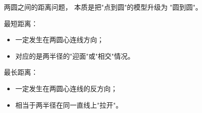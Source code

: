 \begin{explanationbox}
两圆之间的距离问题，
本质是把"点到圆"的模型升级为
"圆到圆"。

最短距离：
\begin{itemize}
  \item 一定发生在两圆心连线方向；
  \item 对应的是两半径的"迎面"或"相交"情况。
\end{itemize}

最长距离：
\begin{itemize}
  \item 一定发生在两圆心连线的反方向；
  \item 相当于两半径在同一直线上"拉开"。
\end{itemize}
\end{explanationbox}
